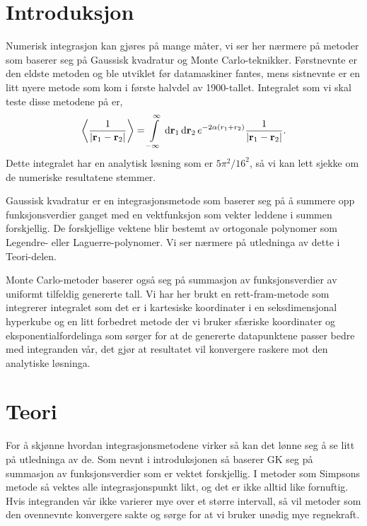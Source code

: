 \documentclass[norsk, 10pt,twocolumn]{article}
\newcommand{\dd}{\, {\text d} }
\def\mean#1{\left\langle #1 \right\rangle}
\newcommand{\mb}[1]{\mathbf{#1}}
\begin{document}
\section*{Introduksjon}
Numerisk integrasjon kan gjøres på mange måter, vi ser her nærmere på metoder som baserer seg på Gaussisk kvadratur og Monte Carlo-teknikker. Førstnevnte er den eldste metoden og ble utviklet før datamaskiner fantes, mens sistnevnte er en litt nyere metode som kom i første halvdel av 1900-tallet. Integralet som vi skal teste disse metodene på er,
\begin{equation}
	\mean{ \frac{1}{|\mb r_1 - \mb r_2|}} = \int\limits_{-\infty}^\infty \dd\mb r_1\dd\mb r_2\, e^{-2\alpha(r_1+r_2)} \frac{1}{|\mb r_1 - \mb r_2|}. \label{integral}
\end{equation}
Dette integralet har en analytisk løsning som er $5\pi^2/16^2$, så vi kan lett sjekke om de numeriske resultatene stemmer.

Gaussisk kvadratur er en integrasjonsmetode som baserer seg på å summere opp funksjonsverdier ganget med en vektfunksjon som vekter leddene i summen forskjellig. De forskjellige vektene blir bestemt av ortogonale polynomer som Legendre- eller Laguerre-polynomer. Vi ser nærmere på utledninga av dette i Teori-delen.

Monte Carlo-metoder baserer også seg på summasjon av funksjonsverdier av uniformt tilfeldig genererte tall. Vi har her brukt en rett-fram-metode som integrerer integralet som det er i kartesiske koordinater i en seksdimensjonal hyperkube og en litt forbedret metode der vi bruker sfæriske koordinater og eksponentialfordelinga som sørger for at de genererte datapunktene passer bedre med integranden vår, det gjør at resultatet vil konvergere raskere mot den analytiske løsninga.

\section*{Teori}
For å skjønne hvordan integrasjonsmetodene virker så kan det lønne seg å se litt på utledninga av de. Som nevnt i introduksjonen så baserer GK seg på summasjon av funksjonsverdier som er vektet forskjellig. I metoder som Simpsons metode så vektes alle integrasjonspunkt likt, og det er ikke alltid like fornuftig. Hvis integranden vår ikke varierer mye over et større intervall, så vil metoder som den ovennevnte konvergere sakte og sørge for at vi bruker unødig mye regnekraft.
\end{document}
